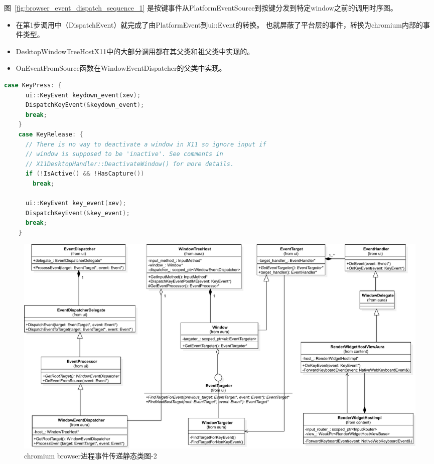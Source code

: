 \documentclass[12pt]{article}
\begin{document}
图~\ref{fig:browser_event_dispatch_sequence_1}
是按键事件从PlatformEventSource到按键分发到特定window之前的调用时序图。

\begin{itemize}
  \item 在第1步调用中（DispatchEvent）就完成了由PlatformEvent到ui::Event的转换。
  也就屏蔽了平台层的事件，转换为chromium内部的事件类型。
  \item DesktopWindowTreeHostX11中的大部分调用都在其父类和祖父类中实现的。
  \item OnEventFromSource函数在WindowEventDispatcher的父类中实现。
\end{itemize}

\begin{spacing}{1.0}
\begin{lstlisting}[language={C++}]
    case KeyPress: {
      ui::KeyEvent keydown_event(xev);
      DispatchKeyEvent(&keydown_event);
      break;
    }
    case KeyRelease: {
      // There is no way to deactivate a window in X11 so ignore input if
      // window is supposed to be 'inactive'. See comments in
      // X11DesktopHandler::DeactivateWindow() for more details.
      if (!IsActive() && !HasCapture())
        break;

      ui::KeyEvent key_event(xev);
      DispatchKeyEvent(&key_event);
      break;
    }
\end{lstlisting}
\end{spacing}


\begin{figure}[H] 
  \centering 
  \includegraphics[width=\textwidth]{image/browser_event_dispatch_class_2.pdf} 
  \caption{chromium browser进程事件传递静态类图-2} \label{fig:linux_event_dispatch_class_2} 
\end{figure}
\end{document}

